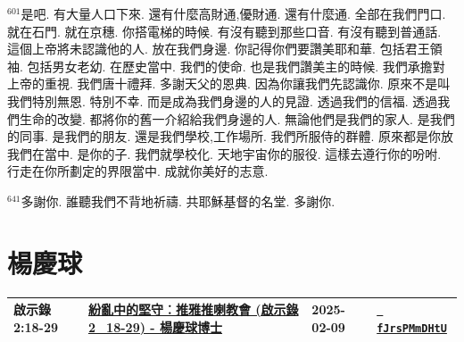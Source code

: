 \documentclass{book}
\begin{document}
$^{601}$是吧.
有大量人口下來.
還有什麼高財通,優財通.
還有什麼通.
全部在我們門口.
就在石門.
就在京穗.
你搭電梯的時候.
有沒有聽到那些口音.
有沒有聽到普通話.
這個上帝將未認識他的人.
放在我們身邊.
你記得你們要讚美耶和華.
包括君王領袖.
包括男女老幼.
在歷史當中.
我們的使命.
也是我們讚美主的時候.
我們承擔對上帝的重視.
我們唐十禮拜.
多謝天父的恩典.
因為你讓我們先認識你.
原來不是叫我們特別無恩.
特別不幸.
而是成為我們身邊的人的見證.
透過我們的信福.
透過我們生命的改變.
都將你的舊一介紹給我們身邊的人.
無論他們是我們的家人.
是我們的同事.
是我們的朋友.
還是我們學校,工作場所.
我們所服侍的群體.
原來都是你放我們在當中.
是你的子.
我們就學校化.
天地宇宙你的服役.
這樣去遵行你的吩咐.
行走在你所劃定的界限當中.
成就你美好的志意.

$^{641}$多謝你.
誰聽我們不背地祈禱.
共耶穌基督的名堂.
多謝你.
\newpage



\chapter{楊慶球}\label{ch:preacher6}
\begin{multicols}{3}
\minitoc
\end{multicols}
{ \scriptsize


\begin{xltabular}{\textwidth}{|p{0.15\textwidth} p{0.6\textwidth}|p{0.07\textwidth} p{0.1\textwidth}|}
\hline
啟示錄 2:18-29 & \hyperref[sec:fJrsPMmDHtU]{紛亂中的堅守︰推雅推喇教會 (啟示錄2\_18-29) - 楊慶球博士} & 2025-02-09 & \href{https://youtube.com/watch?v=fJrsPMmDHtU}{\texttt{ fJrsPMmDHtU}} \\
\hline
\end{xltabular}
}
\newpage
\end{document}
